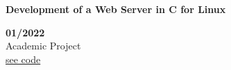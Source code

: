 \begin{minipage}{0.8\textwidth}
    \parbox{0.8\linewidth}{\textbf{Development of a Web Server in C for Linux}} \hfill \textbf{01/2022}\\
    Academic Project\\
    \href{https://github.com/geeksLabTech/web_server}{see code}\\
    \end{minipage} \hfill {}\\\\